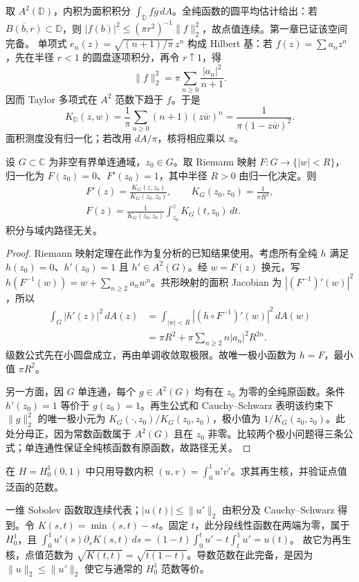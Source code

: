 \begin{example}
取 $A^2(\mathbb D)$，内积为面积积分 $\int_{\mathbb D}f\overline g\,dA$。全纯函数的圆平均估计给出：若 $\overline{B(b,r)}\subset\mathbb D$，则 $|f(b)|^2\le(\pi r^2)^{-1}\|f\|_2^2$，故点值连续。第一章已证该空间完备。
单项式 $e_n(z)=\sqrt{(n+1)/\pi}\,z^n$ 构成 Hilbert 基：若 $f(z)=\sum a_nz^n$，先在半径 $r<1$ 的圆盘逐项积分，再令 $r\uparrow1$，得
\[
 \|f\|_2^2=\pi\sum_{n\ge0}\frac{|a_n|^2}{n+1}.
\]
因而 Taylor 多项式在 $A^2$ 范数下趋于 $f$。于是
\[
 K_{\mathbb D}(z,w)=\frac1\pi\sum_{n\ge0}(n+1)(z\overline w)^n
 =\frac1{\pi(1-z\overline w)^2}.
\]
面积测度没有归一化；若改用 $dA/\pi$，核将相应乘以 $\pi$。
\end{example}

\begin{theorem}\label{thm:y3-bergman-map}
设 $G\subset\mathbb C$ 为非空有界单连通域，$z_0\in G$。取 Riemann 映射 $F:G\to\{|w|<R\}$，归一化为 $F(z_0)=0$、$F'(z_0)=1$，其中半径 $R>0$ 由归一化决定。则
\[
 \begin{gathered}
 F'(z)=\frac{K_G(z,z_0)}{K_G(z_0,z_0)},\qquad
 K_G(z_0,z_0)=\frac1{\pi R^2},\\
 F(z)=\frac1{K_G(z_0,z_0)}\int_{z_0}^zK_G(t,z_0)\,dt.
 \end{gathered}
\]
积分与域内路径无关。
\end{theorem}
\begin{proof}
Riemann 映射定理在此作为复分析的已知结果使用。考虑所有全纯 $h$ 满足 $h(z_0)=0$、$h'(z_0)=1$ 且 $h'\in A^2(G)$。经 $w=F(z)$ 换元，写
$h(F^{-1}(w))=w+\sum_{n\ge2}a_nw^n$。共形映射的面积 Jacobian 为 $|(F^{-1})'(w)|^2$，所以
\[
 \begin{aligned}
 \int_G|h'(z)|^2\,dA(z)
 &=\int_{|w|<R}|(h\circ F^{-1})'(w)|^2\,dA(w)\\
 &=\pi R^2+\pi\sum_{n\ge2}n|a_n|^2R^{2n}.
 \end{aligned}
\]
级数公式先在小圆盘成立，再由单调收敛取极限。故唯一极小函数为 $h=F$，最小值 $\pi R^2$。

另一方面，因 $G$ 单连通，每个 $g\in A^2(G)$ 均有在 $z_0$ 为零的全纯原函数。条件 $h'(z_0)=1$ 等价于 $g(z_0)=1$。再生公式和 Cauchy--Schwarz 表明该约束下 $\|g\|_2^2$ 的唯一极小元为 $K_G(\cdot,z_0)/K_G(z_0,z_0)$，极小值为 $1/K_G(z_0,z_0)$。此处分母正，因为常数函数属于 $A^2(G)$ 且在 $z_0$ 非零。比较两个极小问题得三条公式；单连通性保证全纯核函数有原函数，故路径无关。
\end{proof}

\begin{exercise}
在 $H=H_0^1(0,1)$ 中只用导数内积 $(u,v)=\int_0^1u'\overline{v'}$。求其再生核，并验证点值泛函的范数。
\end{exercise}
\begin{solution}
一维 Sobolev 函数取连续代表；$|u(t)|\le\|u'\|_2$ 由积分及 Cauchy--Schwarz 得到。令 $K(s,t)=\min(s,t)-st$。固定 $t$，此分段线性函数在两端为零，属于 $H_0^1$，且
$\int_0^1u'(s)\partial_sK(s,t)\,ds=(1-t)\int_0^tu'-t\int_t^1u'=u(t)$。
故它为再生核，点值范数为 $\sqrt{K(t,t)}=\sqrt{t(1-t)}$。导数范数在此完备，是因为 $\|u\|_2\le\|u'\|_2$ 使它与通常的 $H_0^1$ 范数等价。
\end{solution}
